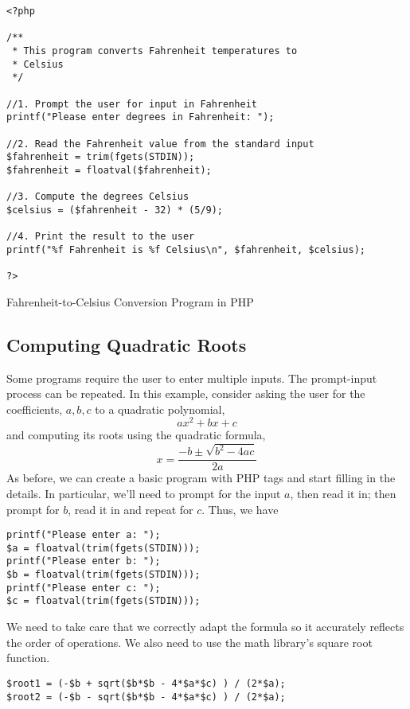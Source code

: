 \begin{listing}[!h]
\begin{verbatim}
<?php

/**
 * This program converts Fahrenheit temperatures to
 * Celsius
 */

//1. Prompt the user for input in Fahrenheit
printf("Please enter degrees in Fahrenheit: ");

//2. Read the Fahrenheit value from the standard input
$fahrenheit = trim(fgets(STDIN));
$fahrenheit = floatval($fahrenheit);

//3. Compute the degrees Celsius
$celsius = ($fahrenheit - 32) * (5/9);

//4. Print the result to the user
printf("%f Fahrenheit is %f Celsius\n", $fahrenheit, $celsius);

?>
\end{verbatim}
\caption{Fahrenheit-to-Celsius Conversion Program in PHP}
\label{code:php:fahrenheitToCelsiusProgram}
\end{listing}

\subsection{Computing Quadratic Roots}

Some programs require the user to enter multiple inputs.  The 
prompt-input process can be repeated.  In this example, consider asking
the user for the coefficients, $a, b, c$ to a quadratic polynomial, 
  $$ax^2 + bx + c$$
and computing its roots using the quadratic formula, 
  $$x = \frac{-b \pm \sqrt{b^2 - 4ac}}{2a}$$
As before, we can create a basic program with PHP tags and start 
filling in the details.  In particular, we'll need to prompt
for the input $a$, then read it in; then prompt for $b$, read it in and
repeat for $c$.  Thus, we have 

\begin{verbatim}
printf("Please enter a: ");
$a = floatval(trim(fgets(STDIN)));
printf("Please enter b: ");
$b = floatval(trim(fgets(STDIN)));
printf("Please enter c: ");
$c = floatval(trim(fgets(STDIN)));
\end{verbatim}

We need to take care that we correctly adapt the formula so it accurately 
reflects the order of operations.  We also need to use the math library's 
square root function.  

\begin{verbatim}
$root1 = (-$b + sqrt($b*$b - 4*$a*$c) ) / (2*$a);
$root2 = (-$b - sqrt($b*$b - 4*$a*$c) ) / (2*$a);
\end{verbatim}


